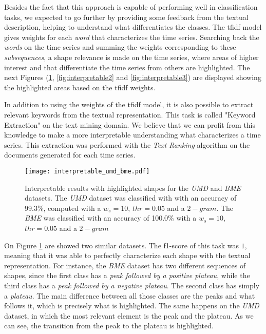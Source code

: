 Besides the fact that this approach is capable of performing well in classification tasks, we expected to go further by providing some feedback from the textual description, helping to understand what differentiates the classes. The \gls{tfidf} model gives weights for each \textit{word} that characterizes the time series. Searching back the \textit{words} on the time series and summing the weights corresponding to these \textit{subsequences}, a shape relevance is made on the time series, where areas of higher interest and that differentiate the time series from others are highlighted. The next Figures (\ref{fig:interpretable1}, \ref{fig:interpretable2} and \ref{fig:interpretable3}) are displayed showing the highlighted areas based on the \gls{tfidf} weights.
\par
In addition to using the weights of the \gls{tfidf} model, it is also possible to extract relevant keywords from the textual representation. This task is called "Keyword Extraction" on the text mining domain. We believe that we can profit from this knowledge to make a more interpretable understanding what characterizes a time series. This extraction was performed with the \textit{Text Ranking} algorithm on the documents generated for each time series.

\begin{figure}[h]
    \centering
    \texttt{[image: interpretable\_umd\_bme.pdf]}
    \caption{Interpretable results with highlighted shapes for the \textit{UMD} and \textit{BME} datasets. The \textit{UMD} dataset was classified with with an accuracy of 99.3\%, computed with a $w_s=10$, $thr=0.05$ and a $2-gram$. The \textit{BME} was classified with an accuracy of 100.0\% with a $w_s=10$, $thr=0.05$ and a $2-gram$}
    \label{fig:interpretable1}
\end{figure}

On Figure \ref{fig:interpretable1} are showed two similar datasets. The f1-score of this task was $1$, meaning that it was able to perfectly characterize each shape with the textual representation. For instance, the \textit{BME} dataset has two different sequences of shapes, since the first class has a \textit{peak followed by a positive plateau}, while the third class has a \textit{peak followed by a negative plateau}. The second class has simply a \textit{plateau}. The main difference between all those classes are the peaks and what follows it, which is precisely what is highlighted. The same happens on the \textit{UMD} dataset, in which the most relevant element is the peak and the plateau. As we can see, the transition from the peak to the plateau is highlighted.

